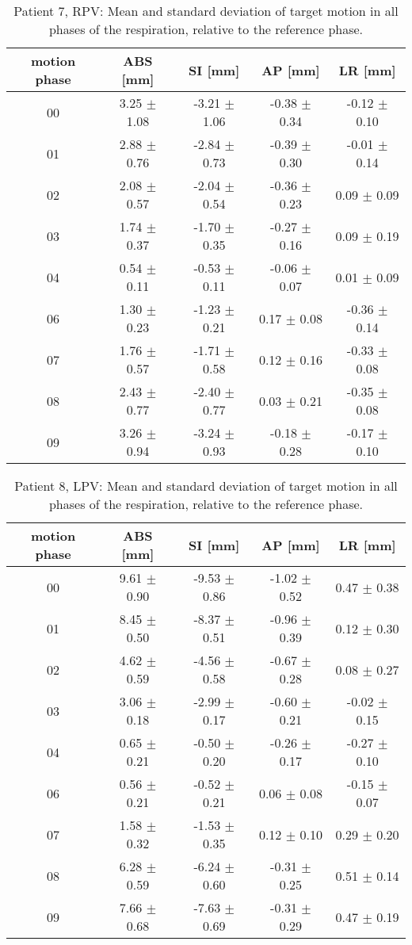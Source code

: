 \begin{table}[H]
  \centering
\caption{Patient 7, RPV: Mean and standard deviation of target motion in all phases of the respiration, relative to the reference phase.}
  \begin{tabular}{|c|c|c|c|c|}
    \hline\hline
    motion phase & ABS [mm] & SI [mm] & AP [mm] & LR [mm]\\
    \hline 
00& 3.25 $\pm$ 1.08& -3.21 $\pm$ 1.06& -0.38 $\pm$ 0.34& -0.12 $\pm$ 0.10 \\
01& 2.88 $\pm$ 0.76& -2.84 $\pm$ 0.73& -0.39 $\pm$ 0.30& -0.01 $\pm$ 0.14 \\
02& 2.08 $\pm$ 0.57& -2.04 $\pm$ 0.54& -0.36 $\pm$ 0.23& 0.09 $\pm$ 0.09 \\
03& 1.74 $\pm$ 0.37& -1.70 $\pm$ 0.35& -0.27 $\pm$ 0.16& 0.09 $\pm$ 0.19 \\
04& 0.54 $\pm$ 0.11& -0.53 $\pm$ 0.11& -0.06 $\pm$ 0.07& 0.01 $\pm$ 0.09 \\
06& 1.30 $\pm$ 0.23& -1.23 $\pm$ 0.21& 0.17 $\pm$ 0.08& -0.36 $\pm$ 0.14 \\
07& 1.76 $\pm$ 0.57& -1.71 $\pm$ 0.58& 0.12 $\pm$ 0.16& -0.33 $\pm$ 0.08 \\
08& 2.43 $\pm$ 0.77& -2.40 $\pm$ 0.77& 0.03 $\pm$ 0.21& -0.35 $\pm$ 0.08 \\
09& 3.26 $\pm$ 0.94& -3.24 $\pm$ 0.93& -0.18 $\pm$ 0.28& -0.17 $\pm$ 0.10 \\
        \hline\hline
  \end{tabular}
\end{table}


\begin{table}[H]
  \centering
  \caption{Patient 8, LPV: Mean and standard deviation of target motion in all phases of the respiration, relative to the reference phase.}
  \begin{tabular}{|c|c|c|c|c|}
    \hline\hline
    motion phase & ABS [mm] & SI [mm] & AP [mm] & LR [mm]\\
    \hline 
00& 9.61 $\pm$ 0.90& -9.53 $\pm$ 0.86& -1.02 $\pm$ 0.52& 0.47 $\pm$ 0.38 \\
01& 8.45 $\pm$ 0.50& -8.37 $\pm$ 0.51& -0.96 $\pm$ 0.39& 0.12 $\pm$ 0.30 \\
02& 4.62 $\pm$ 0.59& -4.56 $\pm$ 0.58& -0.67 $\pm$ 0.28& 0.08 $\pm$ 0.27 \\
03& 3.06 $\pm$ 0.18& -2.99 $\pm$ 0.17& -0.60 $\pm$ 0.21& -0.02 $\pm$ 0.15 \\
04& 0.65 $\pm$ 0.21& -0.50 $\pm$ 0.20& -0.26 $\pm$ 0.17& -0.27 $\pm$ 0.10 \\
06& 0.56 $\pm$ 0.21& -0.52 $\pm$ 0.21& 0.06 $\pm$ 0.08& -0.15 $\pm$ 0.07 \\
07& 1.58 $\pm$ 0.32& -1.53 $\pm$ 0.35& 0.12 $\pm$ 0.10& 0.29 $\pm$ 0.20 \\
08& 6.28 $\pm$ 0.59& -6.24 $\pm$ 0.60& -0.31 $\pm$ 0.25& 0.51 $\pm$ 0.14 \\
09& 7.66 $\pm$ 0.68& -7.63 $\pm$ 0.69& -0.31 $\pm$ 0.29& 0.47 $\pm$ 0.19 \\
        \hline\hline
  \end{tabular}
\end{table}

